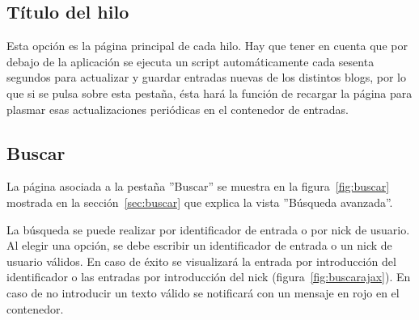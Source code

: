 \documentclass[a4paper, 12pt]{book}
\begin{document}
\subsection{T\'itulo del hilo}
Esta opci\'on es la p\'agina principal de cada hilo. Hay que tener en cuenta que por debajo de la aplicaci\'on se ejecuta un script autom\'aticamente cada 
sesenta segundos para actualizar y guardar entradas nuevas de los distintos blogs, por lo que si se pulsa sobre esta pesta\~na, \'esta har\'a la funci\'on 
de recargar la p\'agina para plasmar esas actualizaciones peri\'odicas en el contenedor de entradas.

\subsection{Buscar}
La p\'agina asociada a la pesta\~na ''Buscar'' se muestra en la figura~\ref{fig:buscar} mostrada en la secci\'on~\ref{sec:buscar} que explica la 
vista ''B\'usqueda avanzada''.

La b\'usqueda se puede realizar por identificador de entrada o por nick de usuario. Al elegir una opci\'on, se debe escribir un identificador de entrada o 
un nick de usuario v\'alidos. En caso de \'exito se visualizar\'a la entrada por introducci\'on del identificador o las entradas por introducci\'on del nick
(figura~\ref{fig:buscarajax}). En caso de no introducir un texto v\'alido se notificar\'a con un mensaje en rojo en el contenedor.
\end{document}

